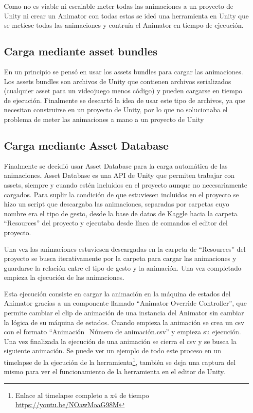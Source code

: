 Como no es viable ni escalable meter todas las animaciones a un proyecto de Unity ni crear un \gls{Animator} con todas estas se ideó una herramienta en Unity que se metiese todas las animaciones y contruía el Animator en tiempo de ejecución.

\subsection{Carga mediante asset bundles}
En un principio se pensó en usar los assets bundles para cargar las animaciones.
Los assets bundles son archivos de Unity que contienen archivos serializados (cualquier asset para un videojuego menos código) y pueden cargarse en tiempo de ejecución.
Finalmente se descartó la idea de usar este tipo de archivos, ya que necesitan construirse en un proyecto de Unity, por lo que no solucionaba el problema de meter las animaciones a mano a un proyecto de Unity

\subsection{Carga mediante Asset Database}
Finalmente se decidió usar Asset Database para la carga automática de las animaciones.
Asset Database es una API de Unity que permiten trabajar con assets, siempre y cuando estén incluidos en el proyecto aunque no necesariamente cargados.
Para suplir la condición de que estuviesen incluidos en el proyecto se hizo un script que descargaba las animaciones, separadas por carpetas cuyo nombre era el tipo de gesto, desde la base de datos de Kaggle hacia la carpeta ``Resources'' del proyecto y ejecutaba desde línea de comandos el editor del proyecto.

Una vez las animaciones estuviesen descargadas en la carpeta de ``Resources'' del proyecto se busca iterativamente por la carpeta para cargar las animaciones y guardarse la relación entre el tipo de gesto y la animación.
Una vez completado empieza la ejecución de las animaciones.

Esta ejecución consiste en cargar la animación en la máquina de estados del \gls{Animator} gracias a un componente llamado ``Animator Override Controller'', que permite cambiar el clip de animación de una instancia del \gls{Animator} sin cambiar la lógica de su máquina de estados.
Cuando empieza la animación se crea un \gls{csv} con el formato ``Animación\_Número de animación.csv'' y empieza su ejecución.
Una vez finalizada la ejecución de una animación se cierra el \gls{csv} y se busca la siguiente animación. Se puede ver un ejemplo de todo este proceso en un timelapse de la ejecución de la herramienta\footnote{Enlace al timelapse completo a x4 de tiempo \url{https://youtu.be/NOawMoaG98M}}, también se deja una captura del mismo para ver el funcionamiento de la herramienta en el editor de Unity.

